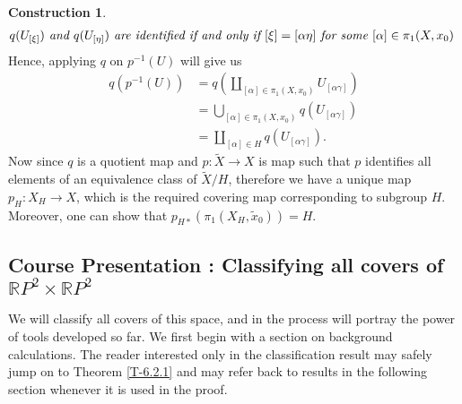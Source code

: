 \documentclass[letterpaper,11pt,twoside]{article}
\theoremstyle{definition}
\theoremstyle{definition}
\theoremstyle{definition}
\theoremstyle{definition}
\theoremstyle{definition}
\theoremstyle{definition}
\newtheorem{construct}[proposition]{\textbf{Construction}}
\theoremstyle{remark}
\theoremstyle{definition}
\newcommand{\R}[0]{\mathbb{R}}
\newcommand{\RP}[0]{\R P}
\begin{document}
\begin{construct}
	\begin{align*}
		\text{\textit{$ q(U_{[\xi]}) $ and $ q(U_{[\eta]}) $ are identified if and only if $ [\xi] = [\alpha\eta] $ for some $ [\alpha] \in \pi_1(X,x_0)$ }}
	\end{align*}
	Hence, applying $ q $ on $ p^{-1}(U) $ will give us
	\begin{align*}
		q(p^{-1}(U)) &= q\left ( \coprod_{[\alpha] \in \pi_1(X,x_0)} U_{[\alpha\gamma]} \right )\\
		&= \bigcup_{[\alpha] \in \pi_1(X,x_0)} q(U_{[\alpha\gamma]})\\
		&= \coprod_{[\alpha] \in H} q(U_{[\alpha\gamma]}).
	\end{align*}
	Now since $ q $ is a quotient map and $ p : \tilde{X} \to X $ is map such that $ p$ identifies all elements of an equivalence class of $ \tilde{X}/H $, therefore we have a unique map $ p_H : X_H \to X $, which is the required covering map corresponding to subgroup $ H $. Moreover, one can show that $ p_{H*}(\pi_1(X_H,\tilde{x}_0)) = H $.
\end{construct}













\newpage
\subsection{{\selectfont 
		\textbf{Course Presentation}
	}: Classifying all covers of $ \RP^{2}\times \RP^{2}$}
We will classify all covers of this space, and in the process will portray the power of tools developed so far. We first begin with a section on background calculations. The reader interested only in the classification result may safely jump on to Theorem \ref{T-6.2.1} and may refer back to results in the following section whenever it is used in the proof.
\end{document}
